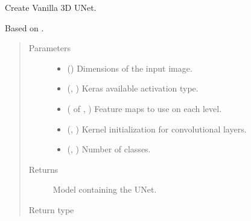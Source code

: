 \documentclass[letterpaper,10pt,english]{sphinxmanual}
\begin{document}
\begin{fulllineitems}
\label{\detokenize{models/vanilla_unet_3d:models.vanilla_unet_3d.Vanilla_U_Net_3D}}
Create Vanilla 3D U\sphinxhyphen{}Net.

Based on .
\begin{quote}\begin{description}
\item[{Parameters}] \leavevmode\begin{itemize}
\item {} 
 () \textendash{} Dimensions of the input image.

\item {} 
 (, ) \textendash{} Keras available activation type.

\item {} 
 ( of , ) \textendash{} Feature maps to use on each level.

\item {} 
 (, ) \textendash{} Kernel initialization for convolutional layers.

\item {} 
 (, ) \textendash{} Number of classes.

\end{itemize}

\item[{Returns}] \leavevmode
{} \textendash{} Model containing the U\sphinxhyphen{}Net.

\item[{Return type}] \leavevmode
{}


\end{description}
\end{quote}
\end{fulllineitems}
\end{document}
